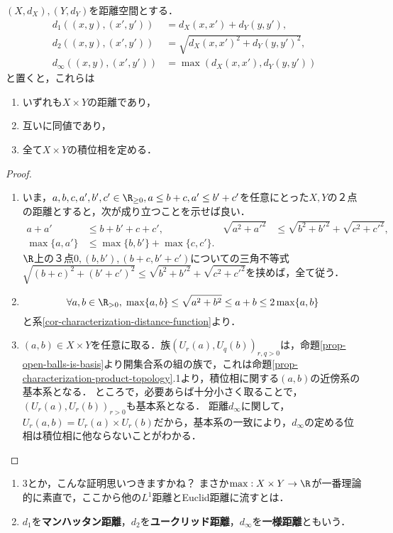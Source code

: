 \documentclass[uplatex,dvipdfmx]{jsreport}
\begin{document}
\begin{proposition}\label{prop-metric-topology-of-l1-l2-lmax}
    $(X,d_X),(Y,d_Y)$を距離空間とする．
    \begin{align*}
        d_1((x,y),(x',y'))&=d_X(x,x')+d_Y(y,y'),\\
        d_2((x,y),(x',y'))&=\sqrt{d_X(x,x')^2+d_Y(y,y')^2},\\
        d_\infty((x,y),(x',y'))&=\max(d_X(x,x'),d_Y(y,y'))
    \end{align*}
    と置くと，これらは
    \begin{enumerate}
        \item いずれも$X\times Y$の距離であり，
        \item 互いに同値であり，
        \item 全て$X\times Y$の積位相を定める．
    \end{enumerate}
\end{proposition}
\begin{proof}\mbox{}
    \begin{enumerate}
        \item いま，$a,b,c,a',b',c'\in\R_{\ge 0},a\le b+c,a'\le b'+c'$を任意にとった$X,Y$の２点の距離とすると，次が成り立つことを示せば良い．
        \begin{align*}
            a+a'&\le b+b'+c+c',&\sqrt{a^2+a'^2}&\le\sqrt{b^2+b'^2}+\sqrt{c^2+c'^2},\\
            \max\{a,a'\}&\le\max\{b,b'\}+\max\{c,c'\}.
        \end{align*}
        $\R$上の３点$0,(b,b'),(b+c,b'+c')$についての三角不等式$\sqrt{(b+c)^2+(b'+c')^2}\le\sqrt{b^2+b'^2}+\sqrt{c^2+c'^2}$を挟めば，全て従う．
        \item \[\forall a,b\in\R_{>0},\;\max\{a,b\}\le\sqrt{a^2+b^2}\le a+b\le 2\max\{a,b\}\]
        と系\ref{cor-characterization-distance-function}より．
        \item $(a,b)\in X\times Y$を任意に取る．族$(U_r(a),U_q(b))_{r,q>0}$は，命題\ref{prop-open-balls-is-basis}より開集合系の組の族で，これは命題\ref{prop-characterization-product-topology}.1より，積位相に関する$(a,b)$の近傍系の基本系となる．
        ところで，必要あらば十分小さく取ることで，$(U_r(a),U_r(b))_{r>0}$も基本系となる．
        距離$d_\infty$に関して，$U_r(a,b)=U_r(a)\times  U_r(b)$だから，基本系の一致により，$d_\infty$の定める位相は積位相に他ならないことがわかる．
    \end{enumerate}
\end{proof}
\begin{remark}\mbox{}
    \begin{enumerate}
        \item 3とか，こんな証明思いつきますかね？
        まさか$\max:X\times Y\to\R$が一番理論的に素直で，ここから他の$L^1$距離とEuclid距離に流すとは．
        \item $d_1$を\textbf{マンハッタン距離}，$d_2$を\textbf{ユークリッド距離}，$d_\infty$を\textbf{一様距離}ともいう．
    \end{enumerate}
\end{remark}
\end{document}
